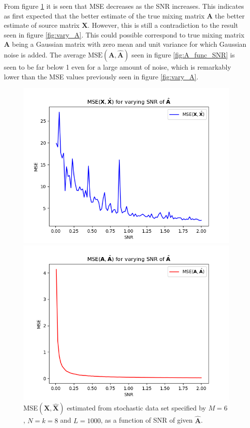 From figure \ref{fig:X_func_SNR} it is seen that MSE decreases as the SNR increases. 
This indicates as first expected that the better estimate of the true mixing matrix $\mathbf{A}$ the better estimate of source matrix $\mathbf{X}$. 
However, this is still a contradiction to the result seen in figure \ref{fig:vary_A}. 
This could possible correspond to true mixing matrix $\mathbf{A}$ being a Gaussian matrix with zero mean and unit variance for which Gaussian noise is added. 
The average $\text{MSE}(\mathbf{A}, \hat{\mathbf{A}})$ seen in figure \ref{fig:A_func_SNR} is seen to be far below 1 even for a large amount of noise, which is remarkably lower than the MSE values previously seen in figure \ref{fig:vary_A}.  
\begin{figure}[H]
\begin{widepage}
    \begin{minipage}[t]{.45\textwidth}
    	\centering
		\includegraphics[scale=0.5]{figures/ch_6/X_func_SNR.png}
		\caption{MSE$(\mathbf{X},\hat{\mathbf{X}})$ estimated from stochastic data set specified by $M = 6$, $N = k = 8$ and $L = 1000$, as a function of SNR of given $\hat{\mathbf{A}}$.}
		\label{fig:X_func_SNR}
    \end{minipage} 
    \hspace{0.5cm}
    \begin{minipage}[t]{.45\textwidth}
        \centering
		\includegraphics[scale=0.5]{figures/ch_6/A_func_SNR.png}

\end{minipage}
\end{widepage}
\end{figure}
